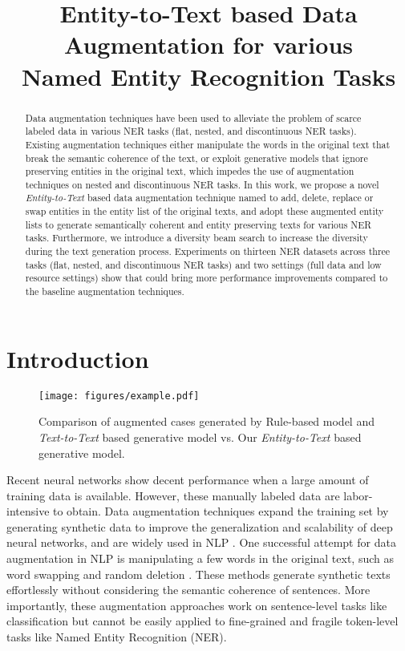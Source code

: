 \title{Entity-to-Text based Data Augmentation for various \\Named Entity Recognition Tasks}



\maketitle
\begin{abstract}

Data augmentation techniques have been used to alleviate the problem of scarce labeled data in various NER tasks (flat, nested, and discontinuous NER tasks). Existing augmentation techniques either manipulate the words in the original text that break the semantic coherence of the text, or exploit generative models that ignore preserving entities in the original text, which impedes the use of augmentation techniques on nested and discontinuous NER tasks. In this work, we propose a novel \textit{Entity-to-Text} based data augmentation technique named {\modelname} to add, delete, replace or swap entities in the entity list of the original texts, and adopt these augmented entity lists to generate semantically coherent and entity preserving texts for various NER tasks. Furthermore, we introduce a diversity beam search to increase the diversity during the text generation process. Experiments on thirteen NER datasets across three tasks (flat, nested, and discontinuous NER tasks) and two settings (full data and low resource settings) show that {\modelname} could bring more performance improvements compared to the baseline augmentation techniques.

\end{abstract}\section{Introduction}
\label{sec:intro}
\begin{figure}[t!]
    \centering
    \texttt{[image: figures/example.pdf]}
    \caption{Comparison of augmented cases generated by Rule-based model and \textit{Text-to-Text} based generative model vs. Our \textit{Entity-to-Text} based generative model.}
    \label{fig:example}
\vspace{-4mm}
\end{figure}
Recent neural networks show decent performance when a large amount of training data is available.
However, these manually labeled data are labor-intensive to obtain. Data augmentation techniques \cite{shorten2019survey} expand the training set by generating synthetic data to improve the generalization and scalability of deep neural networks, and are widely used in NLP \cite{feng2021survey,li2022data}.
One successful attempt for data augmentation in NLP is manipulating a few words in the original text, such as word swapping \cite{csahin2018data,min2020syntactic} and random deletion \cite{kobayashi2018contextual,wei2019eda}. These methods generate synthetic texts effortlessly without considering the semantic coherence of sentences.
More importantly, these augmentation approaches work on sentence-level tasks like classification but cannot be easily applied to fine-grained and fragile token-level tasks like Named Entity Recognition (NER).

